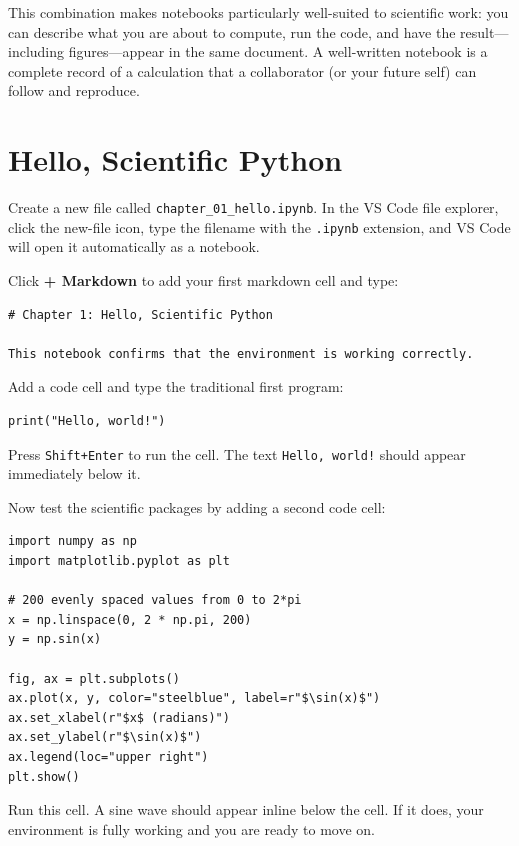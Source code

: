 \documentclass[nobib]{tufte-book}
\begin{document}
This combination makes notebooks particularly well-suited to scientific work:
you can describe what you are about to compute, run the code, and have
the result---including figures---appear in the same document.
A well-written notebook is a complete record of a calculation that a
collaborator (or your future self) can follow and reproduce.

\section{Hello, Scientific Python}

Create a new file called \texttt{chapter\_01\_hello.ipynb}.
In the VS Code file explorer, click the new-file icon, type the filename
with the \texttt{.ipynb} extension, and VS Code will open it automatically
as a notebook.

Click \textbf{+ Markdown} to add your first markdown cell and type:

\begin{lstlisting}[style=bashstyle]
# Chapter 1: Hello, Scientific Python

This notebook confirms that the environment is working correctly.
\end{lstlisting}

Add a code cell and type the traditional first program:

\begin{lstlisting}
print("Hello, world!")
\end{lstlisting}

Press \texttt{Shift+Enter} to run the cell.
The text \texttt{Hello, world!} should appear immediately below it.

\medskip
Now test the scientific packages by adding a second code cell:

\begin{lstlisting}
import numpy as np
import matplotlib.pyplot as plt

# 200 evenly spaced values from 0 to 2*pi
x = np.linspace(0, 2 * np.pi, 200)
y = np.sin(x)

fig, ax = plt.subplots()
ax.plot(x, y, color="steelblue", label=r"$\sin(x)$")
ax.set_xlabel(r"$x$ (radians)")
ax.set_ylabel(r"$\sin(x)$")
ax.legend(loc="upper right")
plt.show()
\end{lstlisting}

Run this cell.
A sine wave should appear inline below the cell.
If it does, your environment is fully working and you are ready to move on.
\end{document}

